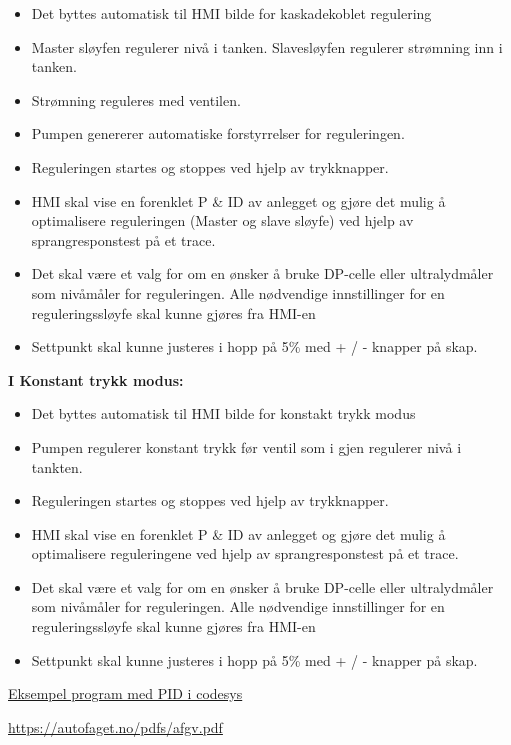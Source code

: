 \begin{itemize}[noitemsep]
	\item Det byttes automatisk til HMI bilde for kaskadekoblet regulering 
	\item Master sløyfen regulerer nivå i tanken. Slavesløyfen regulerer strømning inn i tanken. 
	\item Strømning reguleres med ventilen. 
	\item Pumpen genererer automatiske forstyrrelser for reguleringen. 
	\item Reguleringen startes og stoppes ved hjelp av trykknapper.   
	\item HMI skal vise en forenklet P \& ID av anlegget og gjøre det mulig å optimalisere reguleringen (Master og slave sløyfe) ved hjelp av sprangresponstest på et trace.  
	\item Det skal være et valg for om en ønsker å bruke DP-celle eller ultralydmåler som nivåmåler for reguleringen. Alle nødvendige innstillinger for en reguleringssløyfe skal kunne gjøres fra HMI-en 
	\item Settpunkt skal kunne justeres i hopp på 5\% med + / - knapper på skap.  

\end{itemize}


\textbf{I Konstant trykk modus:}

\begin{itemize}[noitemsep]
	\item Det byttes automatisk til HMI bilde for konstakt trykk modus 
	\item Pumpen regulerer konstant trykk før ventil som  i gjen regulerer nivå i tankten. 
	\item Reguleringen startes og stoppes ved hjelp av trykknapper.   
	\item HMI skal vise en forenklet P \& ID av anlegget og gjøre det mulig å optimalisere reguleringene ved hjelp av sprangresponstest på et trace.  
	\item Det skal være et valg for om en ønsker å bruke DP-celle eller ultralydmåler som nivåmåler for reguleringen. Alle nødvendige innstillinger for en reguleringssløyfe skal kunne gjøres fra HMI-en 
	\item Settpunkt skal kunne justeres i hopp på 5\% med + / - knapper på skap.  

\end{itemize}

\href{https://rfka-my.sharepoint.com/:u:/g/personal/fred-olav_mosdal_skole_rogfk_no/EewzybzUnq5PscHy_uJUvUMB3ufsOB417mgUkhGlC8yQrg?e=rPkbpf}{Eksempel program med PID i codesys}

\vskip 5pt 

\vskip 5pt 



 
\vskip 5pt 
\url {https://autofaget.no/pdfs/afgv.pdf}


